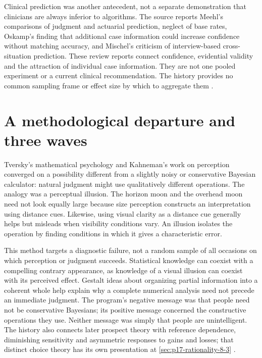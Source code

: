 Clinical prediction was another antecedent, not a separate demonstration
that clinicians are always inferior to algorithms. The source reports
Meehl's comparisons of judgment and actuarial prediction, neglect of
base rates, Oskamp's finding that additional case information could
increase confidence without matching accuracy, and Mischel's criticism
of interview-based cross-situation prediction. These review reports
connect confidence, evidential validity and the attraction of individual
case information. They are not one pooled experiment or a current clinical
recommendation. The history provides no common sampling frame or effect
size by which to aggregate them
\cite[pp.~325--326]{GriffinEtAl2012HeuristicsHistory}.

\section{A methodological departure and three waves}
\label{sec:p19-hph-waves}

Tversky's mathematical psychology and Kahneman's work on perception
converged on a possibility different from a slightly noisy or conservative
Bayesian calculator: natural judgment might use qualitatively different
operations. The analogy was a perceptual illusion. The horizon moon and
the overhead moon need not look equally large because size perception
constructs an interpretation using distance cues. Likewise, using visual
clarity as a distance cue generally helps but misleads when visibility
conditions vary. An illusion isolates the operation by finding conditions
in which it gives a characteristic error.

This method targets a diagnostic failure, not a random sample of all
occasions on which perception or judgment succeeds. Statistical knowledge
can coexist with a compelling contrary appearance, as knowledge of a
visual illusion can coexist with its perceived effect. Gestalt ideas
about organizing partial information into a coherent whole help explain
why a complete numerical analysis need not precede an immediate judgment.
The program's negative message was that people need not be conservative
Bayesians; its positive message concerned the constructive operations
they use. Neither message was simply that people are unintelligent.
The history also connects later prospect theory with reference dependence,
diminishing sensitivity and asymmetric responses to gains and losses;
that distinct choice theory has its own presentation at
\cref{sec:p17-rationality-8-3}
\cite[pp.~326--328]{GriffinEtAl2012HeuristicsHistory}.


